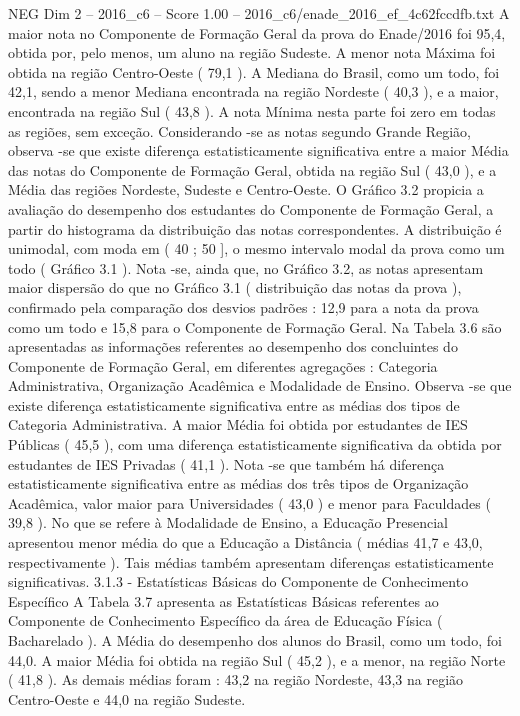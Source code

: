\begin{textsample}{NEG Dim 2 – 2016\_c6 – Score 1.00 – 2016\_c6/enade\_2016\_ef\_4c62fccdfb.txt}
A maior nota no Componente de Formação Geral da prova do Enade/2016 foi 95,4, obtida por, pelo menos, um aluno na região Sudeste.
A menor nota Máxima foi obtida na região Centro-Oeste ( 79,1 ).
A Mediana do Brasil, como um todo, foi 42,1, sendo a menor Mediana encontrada na região Nordeste ( 40,3 ), e a maior, encontrada na região Sul ( 43,8 ).
A nota Mínima nesta parte foi zero em todas as regiões, sem exceção.
Considerando -se as notas segundo Grande Região, observa -se que existe diferença estatisticamente significativa entre a maior Média das notas do Componente de Formação Geral, obtida na região Sul ( 43,0 ), e a Média das regiões Nordeste, Sudeste e Centro-Oeste.
O Gráfico 3.2 propicia a avaliação do desempenho dos estudantes do Componente de Formação Geral, a partir do histograma da distribuição das notas correspondentes.
A distribuição é unimodal, com moda em ( 40 ; 50 ], o mesmo intervalo modal da prova como um todo ( Gráfico 3.1 ).
Nota -se, ainda que, no Gráfico 3.2, as notas apresentam maior dispersão do que no Gráfico 3.1 ( distribuição das notas da prova ), confirmado pela comparação dos desvios padrões : 12,9 para a nota da prova como um todo e 15,8 para o Componente de Formação Geral.
Na Tabela 3.6 são apresentadas as informações referentes ao desempenho dos concluintes do Componente de Formação Geral, em diferentes agregações : Categoria Administrativa, Organização Acadêmica e Modalidade de Ensino.
Observa -se que existe diferença estatisticamente significativa entre as médias dos tipos de Categoria Administrativa.
A maior Média foi obtida por estudantes de IES Públicas ( 45,5 ), com uma diferença estatisticamente significativa da obtida por estudantes de IES Privadas ( 41,1 ).
Nota -se que também há diferença estatisticamente significativa entre as médias dos três tipos de Organização Acadêmica, valor maior para Universidades ( 43,0 ) e menor para Faculdades ( 39,8 ).
No que se refere à Modalidade de Ensino, a Educação Presencial apresentou menor média do que a Educação a Distância ( médias 41,7 e 43,0, respectivamente ).
Tais médias também apresentam diferenças estatisticamente significativas. 3.1.3 - Estatísticas Básicas do Componente de Conhecimento Específico A Tabela 3.7 apresenta as Estatísticas Básicas referentes ao Componente de Conhecimento Específico da área de Educação Física ( Bacharelado ).
A Média do desempenho dos alunos do Brasil, como um todo, foi 44,0.
A maior Média foi obtida na região Sul ( 45,2 ), e a menor, na região Norte ( 41,8 ).
As demais médias foram : 43,2 na região Nordeste, 43,3 na região Centro-Oeste e 44,0 na região Sudeste.

\end{textsample}

